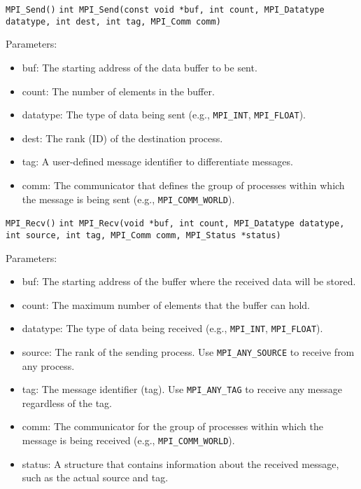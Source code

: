 \documentclass{beamer}
\begin{document}
\begin{frame}[fragile]{\texttt{MPI\_Send()}}
  \texttt{int MPI\_Send(const void *buf, int count, MPI\_Datatype datatype, int dest, int tag, MPI\_Comm comm)}

  Parameters:

  \begin{itemize}
    \item buf: The starting address of the data buffer to be sent.
    \item count: The number of elements in the buffer.
    \item datatype: The type of data being sent (e.g., \texttt{MPI\_INT}, \texttt{MPI\_FLOAT}).
    \item dest: The rank (ID) of the destination process.
    \item tag: A user-defined message identifier to differentiate messages.
    \item comm: The communicator that defines the group of processes within which the message is being sent (e.g., \texttt{MPI\_COMM\_WORLD}).
  \end{itemize}
\end{frame}

\begin{frame}[fragile]{\texttt{MPI\_Recv()}}
  \texttt{int MPI\_Recv(void *buf, int count, MPI\_Datatype datatype, int source, int tag, MPI\_Comm comm, MPI\_Status *status)}

  Parameters:

  \begin{itemize}
    \item buf: The starting address of the buffer where the received data will be stored.
    \item count: The maximum number of elements that the buffer can hold.
    \item datatype: The type of data being received (e.g., \texttt{MPI\_INT}, \texttt{MPI\_FLOAT}).
    \item source: The rank of the sending process. Use \texttt{MPI\_ANY\_SOURCE} to receive from any process.
    \item tag: The message identifier (tag). Use \texttt{MPI\_ANY\_TAG} to receive any message regardless of the tag.
    \item comm: The communicator for the group of processes within which the message is being received (e.g., \texttt{MPI\_COMM\_WORLD}).
    \item status: A structure that contains information about the received message, such as the actual source and tag.
  \end{itemize}
\end{frame}
\end{document}
